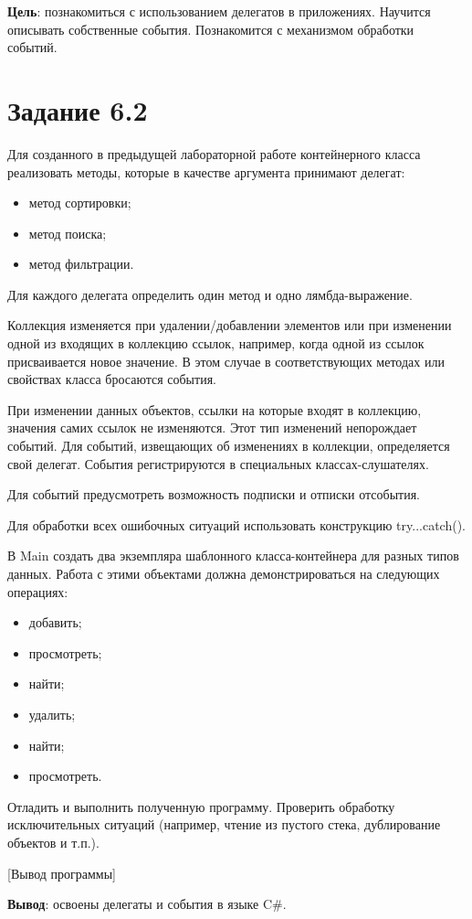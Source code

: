 \documentclass{bsuir}
\newcommand{\csharp}{C{\liberationrm\#}}
\begin{document}
    \maketitle

    \textbf{Цель}: познакомиться с использованием делегатов в приложениях. Научится
    описывать собственные события. Познакомится с механизмом обработки событий.

    \section*{Задание 6.2}

    Для созданного в предыдущей лабораторной работе контейнерного класса
    реализовать методы, которые в качестве аргумента принимают делегат:
    
    \begin{itemize}
        \item метод сортировки;
        \item метод поиска;
        \item метод фильтрации.
    \end{itemize}

    Для каждого делегата определить один метод и одно лямбда-выражение.
    
    Коллекция изменяется при удалении/добавлении элементов или при изменении
    одной из входящих в коллекцию ссылок, например, когда одной из ссылок
    присваивается новое значение. В этом случае в соответствующих методах или
    свойствах класса бросаются события.
    
    При изменении данных объектов, ссылки на которые входят в коллекцию,
    значения самих ссылок не изменяются. Этот тип изменений непорождает событий.
    Для событий, извещающих об изменениях в коллекции, определяется свой
    делегат. События регистрируются в специальных классах-слушателях.
    
    Для событий предусмотреть возможность подписки и отписки отсобытия.
    
    Для обработки всех ошибочных ситуаций использовать конструкцию
    try...catch().
    
    В Main создать два экземпляра шаблонного класса-контейнера для разных типов
    данных. Работа с этими объектами должна демонстрироваться на следующих
    операциях:
    
    \begin{itemize}
        \item добавить;
        \item просмотреть;
        \item найти;
        \item удалить;
        \item найти;
        \item просмотреть.
    \end{itemize}

    Отладить и выполнить полученную программу. Проверить обработку
    исключительных ситуаций (например, чтение из пустого стека, дублирование
    объектов и т.п.).


    [Вывод программы]

    \textbf{Вывод}: освоены делегаты и события в языке \csharp.
\end{document}
